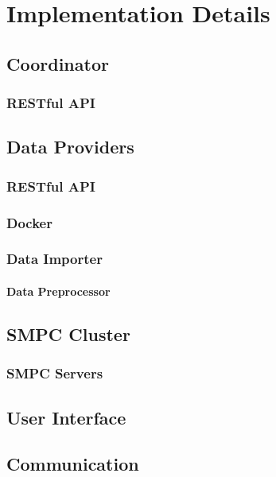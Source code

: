 \chapter{Implementation Details}\label{c:implementation}

\section{Coordinator}\label{s:impl-coordinator}

\subsection{RESTful API}\label{ss:coord-restful-api}



\section{Data Providers}\label{s:impl-data-providers}

\subsection{RESTful API}\label{ss:data-providers-restful-api}

\subsection{Docker}\label{ss:data-providers-docker}

\subsection{Data Importer}\label{ss:data-providers-importer}

\subsubsection{Data Preprocessor}\label{sss:data-providers-preprocessor}



\section{SMPC Cluster}\label{s:impl-smpc-cluster}

\subsection{SMPC Servers}\label{ss:smpc-cluster-servers}



\section{User Interface}\label{s:impl-ui}



\section{Communication}\label{s:impl-communication}

